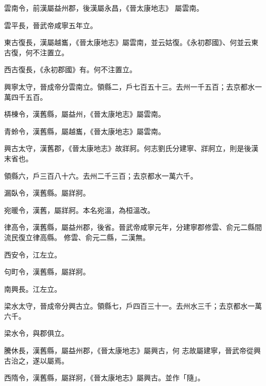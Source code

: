 \begin{pinyinscope}
 雲南令，前漢屬益州郡，後漢屬永昌，《晉太康地志》
 屬雲南。



 雲平長，晉武帝咸寧五年立。



 東古復長，漢屬越巂，《晉太康地志》屬雲南，並云姑復。《永初郡國》、何並云東古復，何不注置立。



 西古復長，《永初郡國》有。何不注置立。



 興寧太守，晉成帝分雲南立。領縣二，戶七百五十三。去州一千五百；去京都水一萬四千五百。



 梇棟令，漢舊縣，屬益州，《晉太康地志》屬雲南。



 青蛉令，漢舊縣，屬越巂，《晉太康地志》屬雲南。



 興古太守，漢舊郡，《晉太康地志》故牂牁。何志劉氏分建寧、牂牁立，則是後漢末省也。



 領縣六，戶三百八十六。去州二千三百；去京都水一萬六千。



 漏臥令，漢舊縣。屬牂牁。



 宛暖令，漢舊，屬牂牁。本名宛溫，為桓溫改。



 律高令，漢舊縣，屬益州郡，後省。晉武帝咸寧元年，分建寧郡修雲、俞元二縣間流民復立律高縣。
 修雲、俞元二縣，二漢無。



 西安令，江左立。



 句町令，漢舊縣，屬牂牁。



 南興長。江左立。



 梁水太守，晉成帝分興古立。領縣七，戶四百三十一。去州水三千；去京都水一萬六千。



 梁水令，與郡俱立。



 騰休長，漢舊縣，屬益州郡，《晉太康地志》屬興古，何
 志故屬建寧，晉武帝從興古治之，遂以屬焉。



 西隋令，漢舊縣，屬牂牁，《晉太康地志》屬興古。並作「隨」。




\end{pinyinscope}
